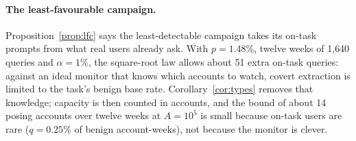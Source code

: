 \paragraph{The least-favourable campaign.} Proposition~\ref{prop:lfc} says the least-detectable campaign takes its on-task prompts from what real users already ask. With $p=1.48\%$, twelve weeks of 1{,}640 queries and $\alpha=1\%$, the square-root law allows about 51 extra on-task queries: against an ideal monitor that knows which accounts to watch, covert extraction is limited to the task's benign base rate. Corollary~\ref{cor:types} removes that knowledge; capacity is then counted in accounts, and the bound of about 14 posing accounts over twelve weeks at $A=10^5$ is small because on-task users are rare ($q=0.25\%$ of benign account-weeks), not because the monitor is clever.

